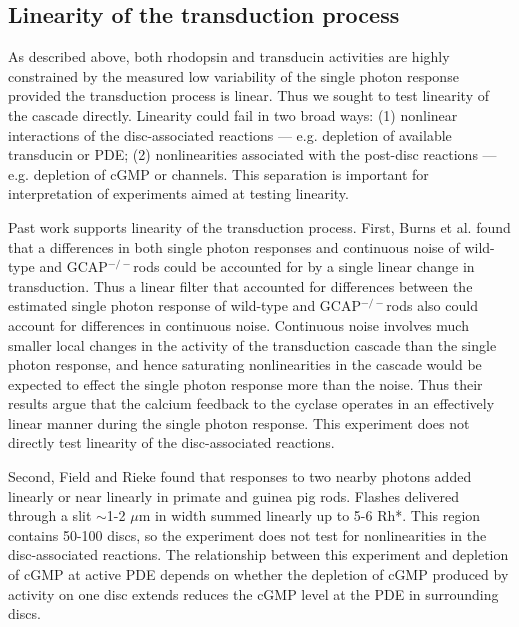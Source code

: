 \documentclass[12pt]{article}
\def\GCAPKO{GCAP$^{-/-}$}
\begin{document}

\subsection{Linearity of the transduction process}

As described above, both rhodopsin and transducin activities are highly constrained by the measured low variability of the single photon response provided the transduction process is linear.  Thus we sought to test linearity of the cascade directly.  Linearity could fail in two broad ways: (1) nonlinear interactions of the disc-associated reactions --- e.g. depletion of available transducin or PDE; (2) nonlinearities associated with the post-disc reactions --- e.g. depletion of cGMP or channels.  This separation is important for interpretation of experiments aimed at testing linearity.

Past work supports linearity of the transduction process.  First, Burns et al. found that a differences in both single photon responses and continuous noise of wild-type and \GCAPKO rods could be accounted for by a single linear change in transduction.  Thus a linear filter that accounted for differences between the estimated single photon response of wild-type and \GCAPKO rods also could account for differences in continuous noise.  Continuous noise involves much smaller local changes in the activity of the transduction cascade than the single photon response, and hence saturating nonlinearities in the cascade would be expected to effect the single photon response more than the noise.  Thus their results argue that the calcium feedback to the cyclase operates in an effectively linear manner during the single photon response.  This experiment does not directly test linearity of the disc-associated reactions.  

Second, Field and Rieke found that responses to two nearby photons added linearly or near linearly in primate and guinea pig rods.  Flashes delivered through a slit $\sim$1-2 $\mu$m in width summed linearly up to 5-6 Rh*.  This region contains 50-100 discs, so the experiment does not test for nonlinearities in the disc-associated reactions.  The relationship between this experiment and depletion of cGMP at active PDE depends on whether the depletion of cGMP produced by activity on one disc extends reduces the cGMP level at the PDE in surrounding discs. 
\end{document}
